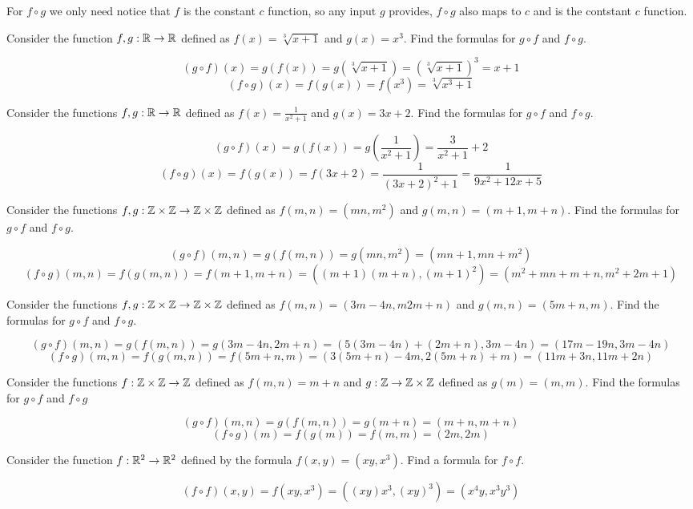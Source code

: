 \documentclass{article}
\begin{document}
For $f \circ g$ we only need notice that $f$ is the constant $c$ function, so any input $g$ provides, $f \circ g$ also maps to $c$ and is the contstant $c$ function.

\begin{problem}
Consider the function $f, g: \mathbb{R} \to \mathbb{R}$ defined as $f(x) = \sqrt[3]{x+1}$ and $g(x) = x^3$. Find the formulas for $g \circ f$ and $f \circ g$.
\end{problem}

$$(g \circ f)(x) = g(f(x)) = g(\sqrt[3]{x + 1}) = \left(\sqrt[3]{x+1}\right)^3 = x + 1$$
$$(f \circ g)(x) = f(g(x)) = f(x^3) = \sqrt[3]{x^3 + 1}$$

\begin{problem}
Consider the functions $f, g: \mathbb{R} \to \mathbb{R}$ defined as $f(x) = \frac{1}{x^2 + 1}$ and $g(x) = 3x + 2$. Find the formulas for $g \circ f$ and $f\circ g$.
\end{problem}

$$(g \circ f)(x) = g(f(x)) = g\left(\frac{1}{x^2 + 1}\right) = \frac{3}{x^2 + 1} + 2$$
$$(f \circ g)(x) = f(g(x)) = f(3x+2) = \frac{1}{(3x + 2)^2 + 1} = \frac{1}{9x^2 + 12x + 5}$$

\begin{problem}
Consider the functions $f, g: \mathbb{Z} \times \mathbb{Z} \to \mathbb{Z} \times \mathbb{Z}$ defined as $f(m, n) = (mn, m^2)$ and $g(m, n) = (m + 1, m + n)$. Find the formulas for $g \circ f$ and $f \circ g$.
\end{problem}

$$(g \circ f)(m, n) = g(f(m, n)) = g(mn, m^2) = (mn + 1, mn + m^2)$$
$$(f \circ g)(m, n) = f(g(m, n)) = f(m + 1, m + n) = ((m+1)(m + n), (m + 1)^2) = (m^2 + mn + m + n, m^2 + 2m + 1)$$

\begin{problem}
Consider the functions $f, g: \mathbb{Z} \times \mathbb{Z} \to \mathbb{Z} \times \mathbb{Z}$ defined as $f(m, n) = (3m - 4n,m 2m + n)$ and $g(m, n) = (5m +n, m)$. Find the formulas for $g\circ f$ and $f\circ g$.
\end{problem}

$$(g\circ f)(m, n) = g(f(m, n)) = g(3m-4n, 2m +n) = (5(3m - 4n) + (2m + n), 3m - 4n) = (17m -19n, 3m -4n)$$
$$(f\circ g)(m, n) = f(g(m, n)) = f(5m+n, m) = (3(5m + n) - 4m, 2(5m+n) + m) = (11m + 3n, 11m + 2n)$$

\begin{problem}
Consider the functions $f:\mathbb{Z} \times \mathbb{Z} \to \mathbb{Z}$ defined as $f(m,n) = m+n$ and $g: \mathbb{Z} \to \mathbb{Z} \times \mathbb{Z}$ defined as $g(m) = (m, m)$. Find the formulas for $g\circ f$ and $f\circ g$
\end{problem}

$$(g\circ f)(m, n) = g(f(m, n)) = g(m +n) = (m+n, m+n)$$
$$(f \circ g)(m) = f(g(m)) = f(m, m) = (2m, 2m)$$

\begin{problem}
Consider the function $f: \mathbb{R}^2 \to \mathbb{R}^2$ defined by the formula $f(x, y) = (xy, x^3).$ Find a formula for $f\circ f$.
\end{problem}

$$(f \circ f)(x, y) = f(xy, x^3) = ((xy)x^3, (xy)^3) = (x^4 y, x^3 y^3)$$
\end{document}
